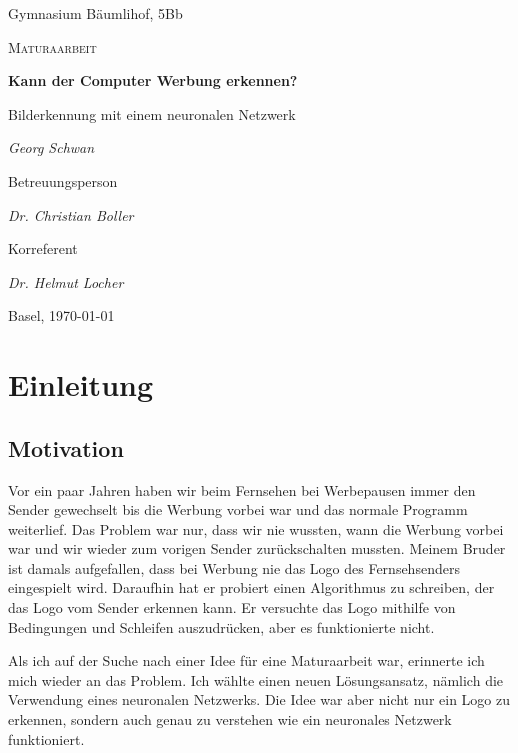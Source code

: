 \documentclass[12pt,a4paper]{report}
\begin{document}
\begin{titlepage}
	\centering
	{\Large Gymnasium Bäumlihof, 5Bb \par}
	\vspace{1cm}
	{\LARGE\scshape Maturaarbeit\par}
	\vspace{1.5cm}
	{\huge\bfseries Kann der Computer Werbung erkennen?\par}
	\vspace{0.6cm}
    {\Large Bilderkennung mit einem neuronalen Netzwerk\par}
	\vspace{2cm}
	{\Large\itshape Georg Schwan\par}
	\vfill
	Betreuungsperson\par
	{\itshape Dr. Christian Boller\par}
	Korreferent\par
	{\itshape Dr. Helmut Locher}
	\vfill
	{\large Basel, \today\par}
\end{titlepage}

\tableofcontents

\chapter{Einleitung}\label{ch:einleitung}

\section{Motivation}
\label{sec:motivation}
Vor ein paar Jahren haben wir beim Fernsehen bei Werbepausen immer den Sender gewechselt
bis die Werbung vorbei war und das normale Programm weiterlief.
Das Problem war nur, dass wir nie wussten, wann die Werbung vorbei war und wir wieder zum vorigen Sender zurückschalten mussten.
Meinem Bruder ist damals aufgefallen, dass bei Werbung nie das Logo des Fernsehsenders eingespielt wird.
Daraufhin hat er probiert einen Algorithmus zu schreiben, der das Logo vom Sender erkennen kann.
Er versuchte das Logo mithilfe von Bedingungen und Schleifen auszudrücken, aber es funktionierte nicht.

Als ich auf der Suche nach einer Idee für eine Maturaarbeit war, erinnerte ich mich wieder an das Problem.
Ich wählte einen neuen Lösungsansatz, nämlich die Verwendung eines neuronalen Netzwerks.
Die Idee war aber nicht nur ein Logo zu erkennen, sondern auch genau zu verstehen wie ein neuronales Netzwerk funktioniert.
\end{document}
